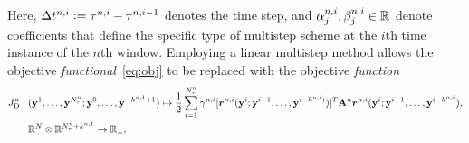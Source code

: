 Here, $\Delta t^{n,i} \vcentcolon= \tau^{n,i} - \tau^{n,i-1}$
denotes the time step, and
$\alpha^{n,i}_j,\beta^{n,i}_j\in\mathbb{R}^{}$ denote coefficients that 
define the specific type of multistep scheme at the $i$th time instance of the $n$th window. 
Employing a linear multistep method allows the objective \textit{functional}~\eqref{eq:obj} to be replaced with the objective \textit{function}
\begin{equation*}%
\begin{split} 
\objectiveArgLMS{n}_{\text{D}} &\vcentcolon
	(\stateyDiscreteArgnt{1},\ldots,\stateyDiscreteArgnt{\nstepsArg{n}};
	\stateyDiscreteArgnt{0},\ldots,\stateyDiscreteArgnt{-\lmsWidthArg{n}{1}+1})
	\mapsto 
\frac{1}{2} \sum_{i=1}^{\nstepsArg{n}} \quadWeightsLMSScalarArg{n}{i} [\residLMSWArg{n}{i}(\stateyDiscreteArgnt{i};\stateyDiscreteArgnt{i-1},\ldots, \stateyDiscreteArgnt{i-\lmsWidthArg{n}{i})})]^T  \stweightingMatArgt{n}{\timeWindowArg{n}{i}} \residLMSWArg{n}{i}(\stateyDiscreteArgnt{i};\stateyDiscreteArgnt{i-1},\ldots, \stateyDiscreteArgnt{i-\lmsWidthArg{n}{i}}), \\
&\vcentcolon \RR{\fomdim} \otimes \RR{\nstepsArg{n} + \lmsWidthArg{n}{1}} \rightarrow
\RR{}_+, 
\end{split}
\end{equation*}
